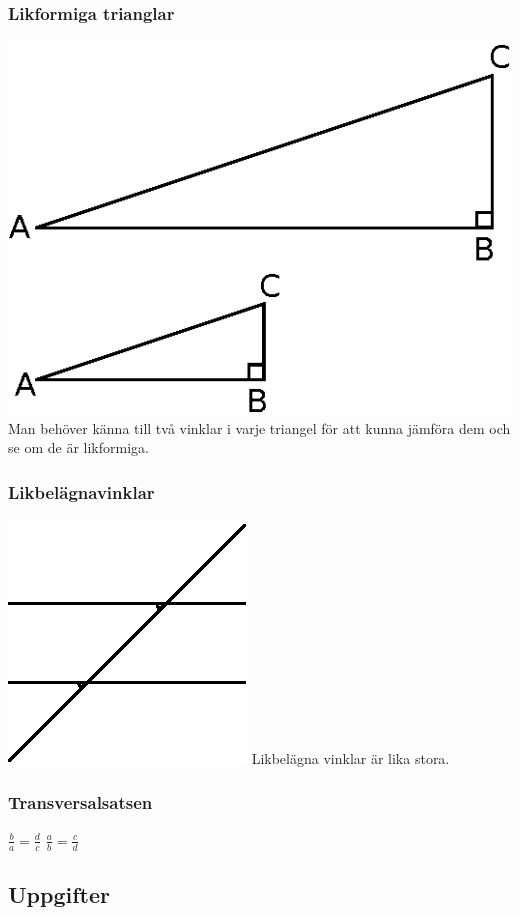 \documentclass[a4paper,11pt]{article}
\begin{document}
\begin{flushleft}
\subsubsection{Likformiga trianglar}
\includegraphics{likformighet2.eps}\newline
Man behöver känna till två vinklar i varje triangel för att kunna jämföra dem och se om de är likformiga.
\subsubsection{Likbelägnavinklar}
\includegraphics{likbelagna.eps}\newline
Likbelägna vinklar är lika stora.
\subsubsection{Transversalsatsen}
$ \frac{b}{a} = \frac{d}{c} $
$ \frac{a}{b} = \frac{c}{d} $\newline
\subsection{Uppgifter}

\end{flushleft}
\end{document}
